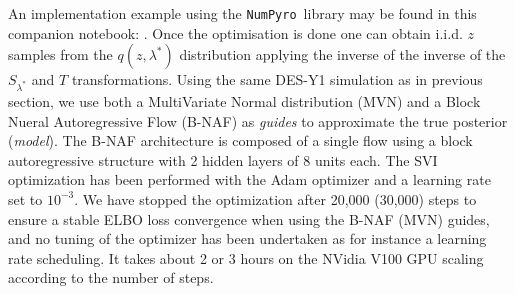 \documentclass[twocolumn,twocolappendix,nofootinbib,iop]{openjournal}
\newcommand{\nblink}[1]{\href{https://github.com/DifferentiableUniverseInitiative/jax-cosmo-paper/blob/master/notebooks/#1.ipynb}{\faFileCodeO}}
\newcommand{\FrL}[1]{{\color{cyan}FL: #1}}
\newcommand{\JZ}[1]{{\color{purple}JZ: #1}}
\newcommand{\JEC}[1]{{\color{magenta}JEC: #1}}
\newcommand{\numpyro}{\texttt{NumPyro}}
\begin{document}
%
An implementation example using the \numpyro\ library may be found in this companion notebook: \nblink{DES_Y1_SVI_and_NeutraReparam}.
%
Once the optimisation is done one can obtain  i.i.d. $z$ samples from the $q(z,\lambda^\ast)$ distribution  applying the inverse of the inverse of the $S_{\lambda^\ast}$ and $T$ transformations. Using the same DES-Y1 simulation as in previous section, we use both a MultiVariate Normal distribution (MVN) and a Block Nueral Autoregressive Flow (B-NAF) \citep{pmlr-v115-de-cao20a} as \textit{guides} to approximate the true posterior (\textit{model}). The B-NAF architecture is composed of a single flow using a block autoregressive structure with 2 hidden layers of 8 units each. The SVI optimization has been performed with the Adam optimizer \citep{KingmaB14} and a learning rate set to $10^{-3}$. We have stopped the optimization after 20,000 (30,000) steps to ensure a stable ELBO loss convergence when using the B-NAF (MVN) guides, and no tuning of the optimizer has been undertaken as for instance a learning rate scheduling. It takes about 2 or 3 hours on the NVidia V100 GPU scaling according to the number of steps.  
\end{document}
